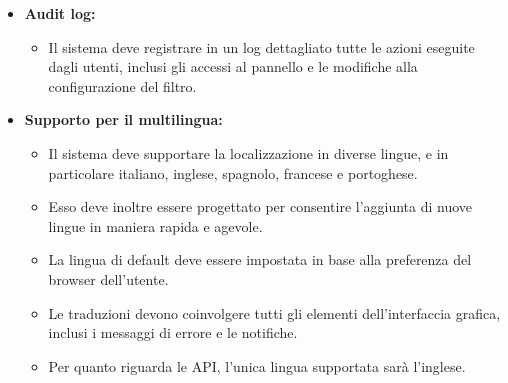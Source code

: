 \begin{itemize}
  \item \textbf{Audit log:}
    \begin{itemize}
      \item Il sistema deve registrare in un log dettagliato tutte le azioni eseguite dagli utenti, inclusi gli accessi al pannello e le modifiche alla configurazione del filtro.
    \end{itemize}

  \item \textbf{Supporto per il multilingua:}
    \begin{itemize}
      \item Il sistema deve supportare la localizzazione in diverse lingue, e in particolare italiano, inglese, spagnolo, francese e portoghese.
      \item Esso deve inoltre essere progettato per consentire l’aggiunta di nuove lingue in maniera rapida e agevole.
      \item La lingua di default deve essere impostata in base alla preferenza del browser dell’utente.
      \item Le traduzioni devono coinvolgere tutti gli elementi dell’interfaccia grafica, inclusi i messaggi di errore e le notifiche.
      \item Per quanto riguarda le API, l'unica lingua supportata sarà l'inglese.
    \end{itemize}
\end{itemize}

